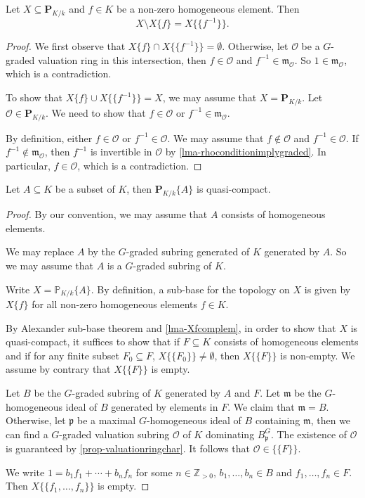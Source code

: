 \begin{lemma}\label{lma-Xfcomplem}
    Let $X\subseteq \mathbf{P}_{K/k}$ and $f\in K$ be a non-zero homogeneous element. Then
    \[
        X\setminus X\{f\}=  X\{\{f^{-1}\}\}.
    \]
\end{lemma}
\begin{proof}
    We first observe that $X\{f\}\cap X\{\{f^{-1}\}\}=\emptyset$. Otherwise, let $\mathcal{O}$ be a $G$-graded valuation ring in this intersection, then $f\in \mathcal{O}$ and $f^{-1}\in \mathfrak{m}_{\mathcal{O}}$. So $1\in \mathfrak{m}_{\mathcal{O}}$, which is a contradiction.

    To show that $X\{f\}\cup  X\{\{f^{-1}\}\}=X$, we may assume that $X=\mathbf{P}_{K/k}$. Let $\mathcal{O}\in \mathbf{P}_{K/k}$. We need to show that $f\in \mathcal{O}$ or $f^{-1}\in \mathfrak{m}_{\mathcal{O}}$.
    
    By definition, either $f\in \mathcal{O}$ or $f^{-1}\in \mathcal{O}$. We may assume that $f\not\in \mathcal{O}$ and $f^{-1}\in \mathcal{O}$. If $f^{-1}\not\in \mathfrak{m}_{\mathcal{O}}$, then $f^{-1}$ is invertible in $\mathcal{O}$ by \cref{lma-rhoconditionimplygraded}. In particular, $f\in \mathcal{O}$, which is a contradiction.
\end{proof}



\begin{lemma}\label{lma-RZpartquasicpt}
    Let $A\subseteq K$ be a subset of $K$, then $\mathbf{P}_{K/k}\{A\}$ is quasi-compact.
\end{lemma}
\begin{proof}
    By our convention, we may assume that $A$ consists of homogeneous elements.

    We may replace $A$ by the $G$-graded subring generated of $K$ generated by $A$. So we may assume that $A$ is a $G$-graded subring of $K$. 
    
    Write $X=\mathbb{P}_{K/k}\{A\}$. By definition, a sub-base for the topology on $X$ is given by $X\{f\}$ for all non-zero homogeneous elements $f\in K$. 

    By Alexander sub-base theorem and \cref{lma-Xfcomplem}, in order to show that $X$ is quasi-compact, it suffices to show that if $F\subseteq K$ consists of homogeneous elements and if for any finite subset $F_0\subseteq F$, $X\{\{F_0\}\}\neq \emptyset$, then $X\{\{F\}\}$ is non-empty. We assume by contrary that $X\{\{F\}\}$ is empty.

    Let $B$ be the $G$-graded subring of $K$ generated by $A$ and $F$. Let $\mathfrak{m}$ be the $G$-homogeneous ideal of $B$ generated by elements in $F$. We claim that $\mathfrak{m}=B$. Otherwise, let $\mathfrak{p}$ be a maximal $G$-homogeneous ideal of $B$ containing $\mathfrak{m}$, then we can find a $G$-graded valuation subring $\mathcal{O}$ of $K$ dominating $B_{\mathfrak{p}}^G$. The existence of $\mathcal{O}$ is guaranteed by \cref{prop-valuationringchar}. It follows that $\mathcal{O}\in \{\{F\}\}$.

    We write $1=b_1 f_1+\cdots+b_nf_n$ for some $n\in \mathbb{Z}_{>0}$, $b_1,\ldots,b_n\in B$ and $f_1,\ldots,f_n\in F$. Then $X\{\{f_1,\ldots,f_n\}\}$ is empty.
\end{proof}


